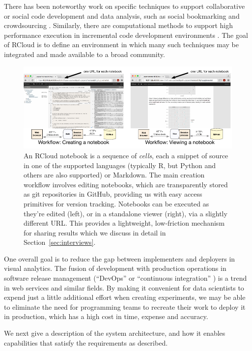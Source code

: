 There has been noteworthy work on specific techniques
to support collaborative or social code development and data analysis,
such as social bookmarking \cite{Millen:2006:DSB} \cite{Heer:2007:VAV}
and crowdsourcing \cite{Fast:2014:ECS}.
Similarly, there are computational methods to support high
performance execution in incremental code development
environments \cite{Guo:2010:TPI}.
The goal of RCloud is to define an environment in which many such
techniques may be integrated and made available to a broad community.
\begin{figure}
\centering
\includegraphics[width=.95\linewidth]{fig/notebook/notebook.pdf}
\caption{\label{fig:notebook}An RCloud notebook is a sequence of
\emph{cells}, each a snippet of source in one of the supported languages (typically R, but Python and others are also supported) or Markdown. The main creation workflow involves editing notebooks, which are transparently stored as git repositories in GitHub, providing us with easy access primitives for version tracking. Notebooks can be executed as they're edited (left), or in a standalone viewer (right), via a slightly different URL. This provides a lightweight, low-friction mechanism for sharing results which we discuss in detail in Section~\ref{sec:interviews}. }
\end{figure}

One overall goal is to reduce the gap between implementers and
deployers in visual analytics. The fusion of development with
production operations in software release management (``DevOps''
\cite{Httermann:2012:DD} or ``continuous integration''
\cite{Fowler:2006:Continuous}) is a trend in web services and similar
fields. By making it convenient for data scientists to expend just a
little additional effort when creating experiments, we may be able to
eliminate the need for programming teams to recreate their work to
deploy it in production, which has a high cost in time, expense and
accuracy.

We next give a description of the system architecture,
and how it enables capabilities that satisfy the requirements as described.
